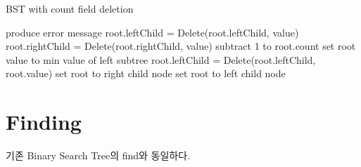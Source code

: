 \documentclass[a4paper, 11pt]{article}
\begin{document}
\begin{algorithm}
	\caption{BST with count field deletion}
	\begin{algorithmic}
				\State produce error message
				\State root.leftChild = Delete(root.leftChild, value)
				\State root.rightChild = Delete(root.rightChild, value)
				\State subtract 1 to root.count
				\State set root value to min value of left subtree
				\State root.leftChild = Delete(root.leftChild, root.value)
			\Else
					\State set root to right child node
					\State set root to left child node
				\EndIf
			\EndIf
		\EndFunction
	\end{algorithmic}
\end{algorithm}

\section{Finding}
기존 Binary Search Tree의 find와 동일하다.
\end{document}
